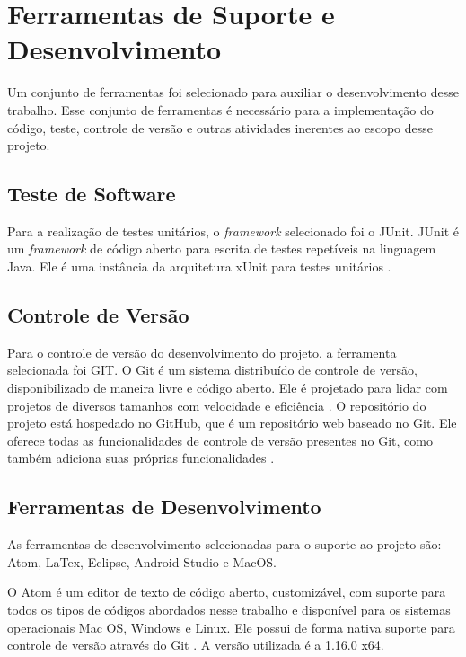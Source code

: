 \section{Ferramentas de Suporte e Desenvolvimento}
\label{sec:tecsuportedesenvolvimento}

Um conjunto de ferramentas foi selecionado para auxiliar o desenvolvimento desse trabalho. Esse conjunto de ferramentas é necessário para a implementação do código, teste, controle de versão e outras atividades inerentes ao escopo desse projeto.

    \subsection{Teste de Software}

Para a realização de testes unitários, o \textit{framework} selecionado foi o JUnit. JUnit é um \textit{framework} de código aberto para escrita de testes repetíveis na linguagem Java. Ele é uma instância da arquitetura xUnit para testes unitários \cite{junit2015}.

    \subsection{Controle de Versão}

Para o controle de versão do desenvolvimento do projeto, a ferramenta selecionada foi GIT. O Git é um sistema distribuído de controle de versão, disponibilizado de maneira livre e código aberto. Ele é projetado para lidar com projetos de diversos tamanhos com velocidade e eficiência \cite{git}. O repositório do projeto está hospedado no GitHub, que é um repositório web baseado no Git. Ele oferece todas as funcionalidades de controle de versão presentes no Git, como também adiciona suas próprias funcionalidades \cite{gitHub}.

    \subsection{Ferramentas de Desenvolvimento}

As ferramentas de desenvolvimento selecionadas para o suporte ao projeto são: Atom, LaTex, Eclipse, Android Studio e MacOS.

O Atom é um editor de texto de código aberto, customizável, com suporte para todos
os tipos de códigos abordados nesse trabalho e disponível para os sistemas
operacionais Mac OS, Windows e Linux. Ele possui de forma nativa suporte para
controle de versão através do Git \cite{atom}. A versão utilizada é a 1.16.0 x64.

